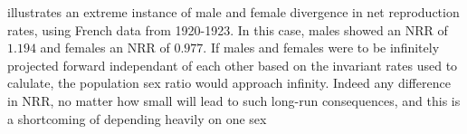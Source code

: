 
\citet{kuczynski1932fertility} illustrates an extreme instance of male and
female divergence in net reproduction rates, using French data from
1920-1923. In this case, males showed an NRR of $1.194$ and females an NRR of
$0.977$. If males and females were to be infinitely projected forward
independant of each other based on the invariant rates used to calulate, the
population sex ratio would approach infinity. Indeed any difference in NRR, no
matter how small will lead to such long-run consequences, and this is a
shortcoming of depending heavily on one sex

